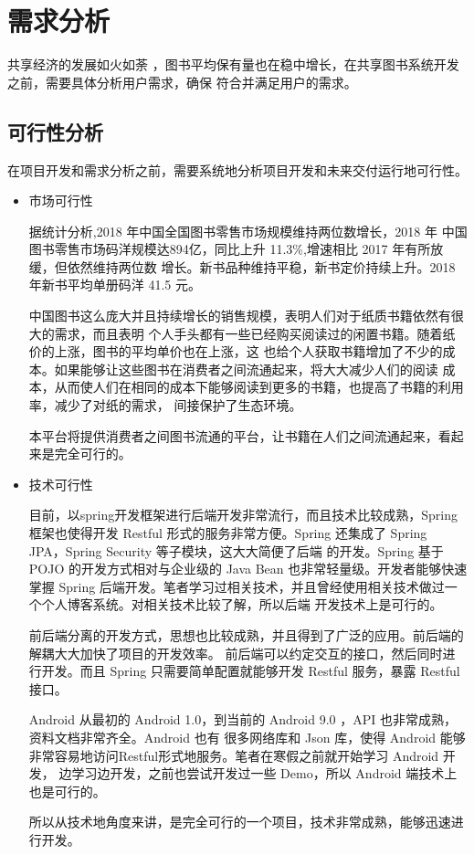 
\chapter{需求分析}
共享经济的发展如火如荼 \cite{SharingEconomy2}，图书平均保有量也在稳中增长，在共享图书系统开发之前，需要具体分析用户需求，确保
符合并满足用户的需求。

\section{可行性分析}
在项目开发和需求分析之前，需要系统地分析项目开发和未来交付运行地可行性。

\begin{itemize}
	\item 市场可行性
	
	据统计分析\cite{BookMarketReport2018},2018 年中国全国图书零售市场规模维持两位数增长，2018 年
	中国图书零售市场码洋规模达894亿，同比上升 11.3\%,增速相比 2017 年有所放缓，但依然维持两位数
	增长。新书品种维持平稳，新书定价持续上升。2018 年新书平均单册码洋 41.5 元。
	
	中国图书这么庞大并且持续增长的销售规模，表明人们对于纸质书籍依然有很大的需求，而且表明
	个人手头都有一些已经购买阅读过的闲置书籍。随着纸价的上涨，图书的平均单价也在上涨，这
	也给个人获取书籍增加了不少的成本。如果能够让这些图书在消费者之间流通起来，将大大减少人们的阅读
	成本，从而使人们在相同的成本下能够阅读到更多的书籍，也提高了书籍的利用率，减少了对纸的需求，
	间接保护了生态环境。
	
	本平台将提供消费者之间图书流通的平台，让书籍在人们之间流通起来，看起来是完全可行的。

	\item 技术可行性
	
	目前，以spring开发框架进行后端开发非常流行，而且技术比较成熟，Spring 框架也使得开发 Restful
	形式的服务非常方便。Spring 还集成了 Spring JPA，Spring Security 等子模块，这大大简便了后端
	的开发。Spring 基于 POJO 的开发方式相对与企业级的 Java Bean 也非常轻量级。开发者能够快速掌握 Spring
	后端开发。笔者学习过相关技术，并且曾经使用相关技术做过一个个人博客系统。对相关技术比较了解，所以后端
	开发技术上是可行的。

	前后端分离\cite{backendDispart}的开发方式，思想也比较成熟，并且得到了广泛的应用。前后端的解耦大大加快了项目的开发效率。
	前后端可以约定交互的接口，然后同时进行开发。而且 Spring 只需要简单配置就能够开发 Restful 服务，暴露
	Restful 接口。

	Android 从最初的 Android 1.0，到当前的 Android 9.0 ，API 也非常成熟，资料文档非常齐全。Android 也有
	很多网络库和 Json 库，使得 Android 能够非常容易地访问Restful形式地服务。笔者在寒假之前就开始学习 Android 开发，
	边学习边开发，之前也尝试开发过一些 Demo，所以 Android 端技术上也是可行的。

	所以从技术地角度来讲，是完全可行的一个项目，技术非常成熟，能够迅速进行开发。
	
\end{itemize}



